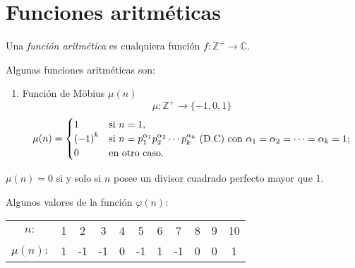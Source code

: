 \chapter{Funciones aritméticas}

\begin{definition}
Una \emph{función aritmética} es cualquiera función $f\colon\mathbb{Z}^{+}\rightarrow\mathbb{C}$.	
\end{definition}

Algunas funciones aritméticas son:

\begin{enumerate}
	\item Función de M\"{o}bius $\mu(n)$
	\[\mu\colon\mathbb{Z}^{+}\longrightarrow\{-1,0,1\}\]
	\[
	\mu(n)= 
	\begin{cases}
	1 & \text{si } n=1,\\
	{(-1)}^{k}  & \text{si } n={p}^{\alpha_1}_{1}{p}^{\alpha_2}_{2}\cdots{p}^{\alpha_k}_{k}\text{ (D.C)}\text{ con } \alpha_1=\alpha_2=\cdots=\alpha_k=1;\\
	0&\text{en otro caso.}
	\end{cases}
	\]
\end{enumerate}

\begin{remark} $\mu(n)=0$ si y solo si $n$ posee un divisor cuadrado perfecto mayor que 1.
\end{remark}
\begin{example}
	Algunos valores de la función $\varphi(n)\colon$
	
\begin{table}[H]
	\centering
	\begin{tabular}{ccccccccccc}
		$n\colon$ &1 &2 &3 & 4 & 5 & 6 & 7 & 8 &9 & 10\\[0.1cm]
		$\mu(n)\colon$ &1 &-1 & -1 & 0 & -1 & 1 & -1 & 0 & 0 & 1
	\end{tabular}
\end{table}

\end{example}

